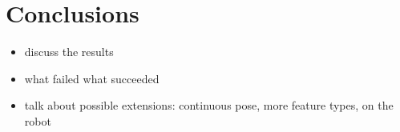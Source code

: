 \section{Conclusions}
    \begin{itemize}
        \item discuss the results
        \item what failed what succeeded
        \item talk about possible extensions: continuous pose, more feature types, on the robot
    \end{itemize}